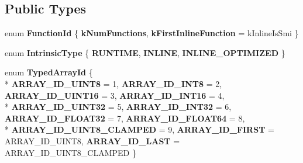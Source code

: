 \subsection*{Public Types}
\begin{DoxyCompactItemize}
\item 
\hypertarget{classv8_1_1internal_1_1_runtime_a013b8c319f323c8e688a6f598845835a}{}enum {\bfseries Function\+Id} \{ {\bfseries k\+Num\+Functions}, 
{\bfseries k\+First\+Inline\+Function} = k\+Inline\+Is\+Smi
 \}\label{classv8_1_1internal_1_1_runtime_a013b8c319f323c8e688a6f598845835a}

\item 
\hypertarget{classv8_1_1internal_1_1_runtime_a9794fd24ae9e4731fe6679eca11fef02}{}enum {\bfseries Intrinsic\+Type} \{ {\bfseries R\+U\+N\+T\+I\+M\+E}, 
{\bfseries I\+N\+L\+I\+N\+E}, 
{\bfseries I\+N\+L\+I\+N\+E\+\_\+\+O\+P\+T\+I\+M\+I\+Z\+E\+D}
 \}\label{classv8_1_1internal_1_1_runtime_a9794fd24ae9e4731fe6679eca11fef02}

\item 
\hypertarget{classv8_1_1internal_1_1_runtime_a80bc0fbf6603396cf71c90d7f40b4ece}{}enum {\bfseries Typed\+Array\+Id} \{ \\*
{\bfseries A\+R\+R\+A\+Y\+\_\+\+I\+D\+\_\+\+U\+I\+N\+T8} = 1, 
{\bfseries A\+R\+R\+A\+Y\+\_\+\+I\+D\+\_\+\+I\+N\+T8} = 2, 
{\bfseries A\+R\+R\+A\+Y\+\_\+\+I\+D\+\_\+\+U\+I\+N\+T16} = 3, 
{\bfseries A\+R\+R\+A\+Y\+\_\+\+I\+D\+\_\+\+I\+N\+T16} = 4, 
\\*
{\bfseries A\+R\+R\+A\+Y\+\_\+\+I\+D\+\_\+\+U\+I\+N\+T32} = 5, 
{\bfseries A\+R\+R\+A\+Y\+\_\+\+I\+D\+\_\+\+I\+N\+T32} = 6, 
{\bfseries A\+R\+R\+A\+Y\+\_\+\+I\+D\+\_\+\+F\+L\+O\+A\+T32} = 7, 
{\bfseries A\+R\+R\+A\+Y\+\_\+\+I\+D\+\_\+\+F\+L\+O\+A\+T64} = 8, 
\\*
{\bfseries A\+R\+R\+A\+Y\+\_\+\+I\+D\+\_\+\+U\+I\+N\+T8\+\_\+\+C\+L\+A\+M\+P\+E\+D} = 9, 
{\bfseries A\+R\+R\+A\+Y\+\_\+\+I\+D\+\_\+\+F\+I\+R\+S\+T} = A\+R\+R\+A\+Y\+\_\+\+I\+D\+\_\+\+U\+I\+N\+T8, 
{\bfseries A\+R\+R\+A\+Y\+\_\+\+I\+D\+\_\+\+L\+A\+S\+T} = A\+R\+R\+A\+Y\+\_\+\+I\+D\+\_\+\+U\+I\+N\+T8\+\_\+\+C\+L\+A\+M\+P\+E\+D
 \}\label{classv8_1_1internal_1_1_runtime_a80bc0fbf6603396cf71c90d7f40b4ece}

\end{DoxyCompactItemize}
